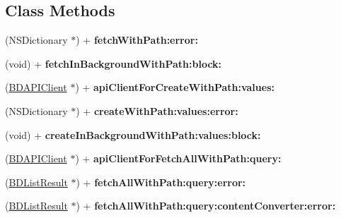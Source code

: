 \subsection*{Class Methods}
\begin{DoxyCompactItemize}
\item 
\hypertarget{interface_b_d_a_p_i_client_a33c7b547d235f4815582e3be8cabb8ef}{(N\-S\-Dictionary $\ast$) + {\bfseries fetch\-With\-Path\-:error\-:}}\label{interface_b_d_a_p_i_client_a33c7b547d235f4815582e3be8cabb8ef}

\item 
\hypertarget{interface_b_d_a_p_i_client_a3bfbd607291e1f0601b31c42346fd26a}{(void) + {\bfseries fetch\-In\-Background\-With\-Path\-:block\-:}}\label{interface_b_d_a_p_i_client_a3bfbd607291e1f0601b31c42346fd26a}

\item 
\hypertarget{interface_b_d_a_p_i_client_a1c2dff6568b206ce5d0c14ddf58f7d30}{(\hyperlink{interface_b_d_a_p_i_client}{B\-D\-A\-P\-I\-Client} $\ast$) + {\bfseries api\-Client\-For\-Create\-With\-Path\-:values\-:}}\label{interface_b_d_a_p_i_client_a1c2dff6568b206ce5d0c14ddf58f7d30}

\item 
\hypertarget{interface_b_d_a_p_i_client_a16602ce815694dad22ed7e60cc93532b}{(N\-S\-Dictionary $\ast$) + {\bfseries create\-With\-Path\-:values\-:error\-:}}\label{interface_b_d_a_p_i_client_a16602ce815694dad22ed7e60cc93532b}

\item 
\hypertarget{interface_b_d_a_p_i_client_a6f79435640e39c422d1b438fa5739e25}{(void) + {\bfseries create\-In\-Background\-With\-Path\-:values\-:block\-:}}\label{interface_b_d_a_p_i_client_a6f79435640e39c422d1b438fa5739e25}

\item 
\hypertarget{interface_b_d_a_p_i_client_acbeb1823c7f2f36e883ddd960ef64e87}{(\hyperlink{interface_b_d_a_p_i_client}{B\-D\-A\-P\-I\-Client} $\ast$) + {\bfseries api\-Client\-For\-Fetch\-All\-With\-Path\-:query\-:}}\label{interface_b_d_a_p_i_client_acbeb1823c7f2f36e883ddd960ef64e87}

\item 
\hypertarget{interface_b_d_a_p_i_client_a11c058c6ccf068c39bfd3cd2b902f3cb}{(\hyperlink{interface_b_d_list_result}{B\-D\-List\-Result} $\ast$) + {\bfseries fetch\-All\-With\-Path\-:query\-:error\-:}}\label{interface_b_d_a_p_i_client_a11c058c6ccf068c39bfd3cd2b902f3cb}

\item 
\hypertarget{interface_b_d_a_p_i_client_ac5505b09949b9ad544c63fcda8f676d2}{(\hyperlink{interface_b_d_list_result}{B\-D\-List\-Result} $\ast$) + {\bfseries fetch\-All\-With\-Path\-:query\-:content\-Converter\-:error\-:}}\label{interface_b_d_a_p_i_client_ac5505b09949b9ad544c63fcda8f676d2}


\end{DoxyCompactItemize}
